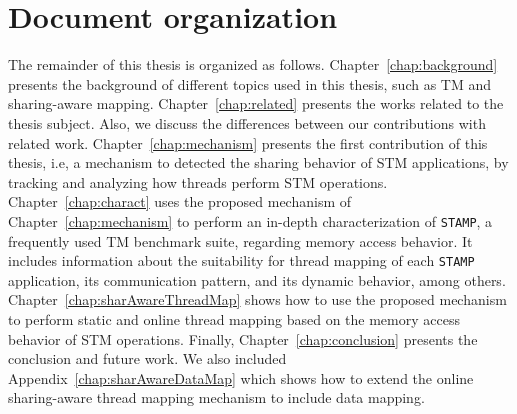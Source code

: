 \section{Document organization}

The remainder of this thesis is organized as follows. Chapter~\ref{chap:background} presents the background of different topics used in this thesis, such as TM and sharing-aware mapping. Chapter~\ref{chap:related} presents the works related to the thesis subject. Also, we discuss the differences between our contributions with related work. Chapter~\ref{chap:mechanism} presents the first contribution of this thesis, i.e, a mechanism to detected the sharing behavior of STM applications, by tracking and analyzing how threads perform STM operations. Chapter~\ref{chap:charact} uses the proposed mechanism of Chapter~\ref{chap:mechanism} to perform an in-depth characterization of \texttt{STAMP}, a frequently used TM benchmark suite, regarding memory access behavior. It includes information about the suitability for thread mapping of each \texttt{STAMP} application, its communication pattern, and its dynamic behavior, among others. Chapter~\ref{chap:sharAwareThreadMap} shows how to use the proposed mechanism to perform static and online thread mapping based on the memory access behavior of STM operations. %
Finally, Chapter~\ref{chap:conclusion} presents the conclusion and future work. We also included Appendix~\ref{chap:sharAwareDataMap} which shows how to extend the online sharing-aware thread mapping mechanism to include data mapping. 

